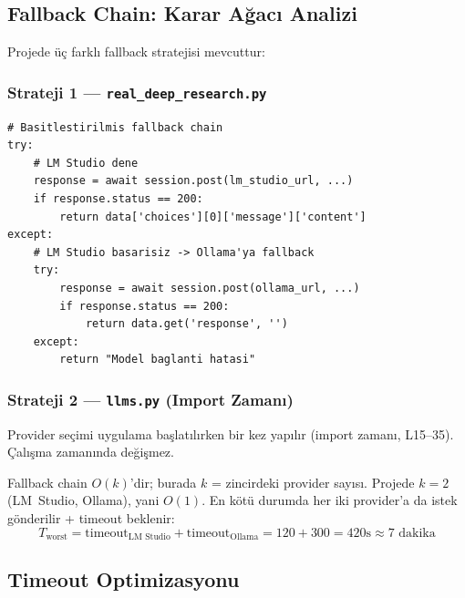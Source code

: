\subsection{Fallback Chain: Karar A\u{g}ac{\i} Analizi}
\label{sec:llm-fallback-chain}

Projede \"{u}\c{c} farkl{\i} fallback stratejisi mevcuttur:

\subsubsection{Strateji 1 --- \texttt{real\_deep\_research.py}}

\begin{lstlisting}
# Basitlestirilmis fallback chain
try:
    # LM Studio dene
    response = await session.post(lm_studio_url, ...)
    if response.status == 200:
        return data['choices'][0]['message']['content']
except:
    # LM Studio basarisiz -> Ollama'ya fallback
    try:
        response = await session.post(ollama_url, ...)
        if response.status == 200:
            return data.get('response', '')
    except:
        return "Model baglanti hatasi"
\end{lstlisting}

\subsubsection{Strateji 2 --- \texttt{llms.py} (Import Zaman{\i})}

Provider se\c{c}imi uygulama ba\c{s}lat{\i}l{\i}rken bir kez yap{\i}l{\i}r (import zaman{\i}, L15--35). \c{C}al{\i}\c{s}ma zaman{\i}nda de\u{g}i\c{s}mez.

\begin{formulbox}
Fallback chain $O(k)$'dir; burada $k$ = zincirdeki provider say{\i}s{\i}. Projede $k{=}2$ (LM~Studio, Ollama), yani $O(1)$. En k\"{o}t\"{u} durumda her iki provider'a da istek g\"{o}nderilir + timeout beklenir:
\begin{equation}
T_{\text{worst}} = \text{timeout}_{\text{LM Studio}} + \text{timeout}_{\text{Ollama}} = 120 + 300 = 420 \text{s} \approx 7 \text{ dakika}
\label{eq:fallback-worst}
\end{equation}
\end{formulbox}


\subsection{Timeout Optimizasyonu}
\label{sec:timeout}


